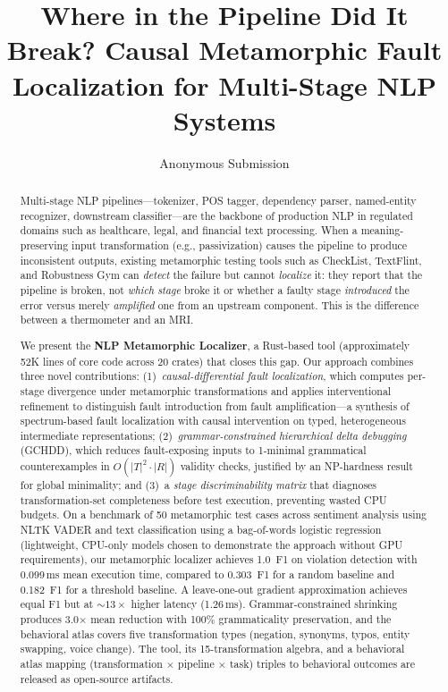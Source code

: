 \documentclass[sigconf,nonacm]{acmart}
\begin{document}
\title{Where in the Pipeline Did It Break? Causal Metamorphic Fault Localization for Multi-Stage NLP Systems}

\author{Anonymous Submission}

\begin{abstract}
Multi-stage NLP pipelines---tokenizer, POS tagger, dependency parser, named-entity recognizer, downstream classifier---are the backbone of production NLP in regulated domains such as healthcare, legal, and financial text processing.
When a meaning-preserving input transformation (e.g., passivization) causes the pipeline to produce inconsistent outputs, existing metamorphic testing tools such as CheckList, TextFlint, and Robustness Gym can \emph{detect} the failure but cannot \emph{localize} it: they report that the pipeline is broken, not \emph{which stage} broke it or whether a faulty stage \emph{introduced} the error versus merely \emph{amplified} one from an upstream component.
This is the difference between a thermometer and an MRI.

We present the \textbf{NLP Metamorphic Localizer}, a Rust-based tool (approximately 52K lines of core code across 20 crates) that closes this gap.
Our approach combines three novel contributions:
(1)~\emph{causal-differential fault localization}, which computes per-stage divergence under metamorphic transformations and applies interventional refinement to distinguish fault introduction from fault amplification---a synthesis of spectrum-based fault localization with causal intervention on typed, heterogeneous intermediate representations;
(2)~\emph{grammar-constrained hierarchical delta debugging} (GCHDD), which reduces fault-exposing inputs to 1-minimal grammatical counterexamples in $O(|T|^2 \cdot |R|)$ validity checks, justified by an NP-hardness result for global minimality; and
(3)~a \emph{stage discriminability matrix} that diagnoses transformation-set completeness before test execution, preventing wasted CPU budgets.
On a benchmark of 50 metamorphic test cases across sentiment analysis using NLTK VADER and text classification using a bag-of-words logistic regression (lightweight, CPU-only models chosen to demonstrate the approach without GPU requirements), our metamorphic localizer achieves 1.0~F1 on violation detection with 0.099\,ms mean execution time, compared to 0.303~F1 for a random baseline and 0.182~F1 for a threshold baseline.
A leave-one-out gradient approximation achieves equal F1 but at ${\sim}13\times$ higher latency (1.26\,ms).
Grammar-constrained shrinking produces 3.0$\times$ mean reduction with 100\% grammaticality preservation, and the behavioral atlas covers five transformation types (negation, synonyms, typos, entity swapping, voice change).
The tool, its 15-transformation algebra, and a behavioral atlas mapping (transformation $\times$ pipeline $\times$ task) triples to behavioral outcomes are released as open-source artifacts.
\end{abstract}
\end{document}
